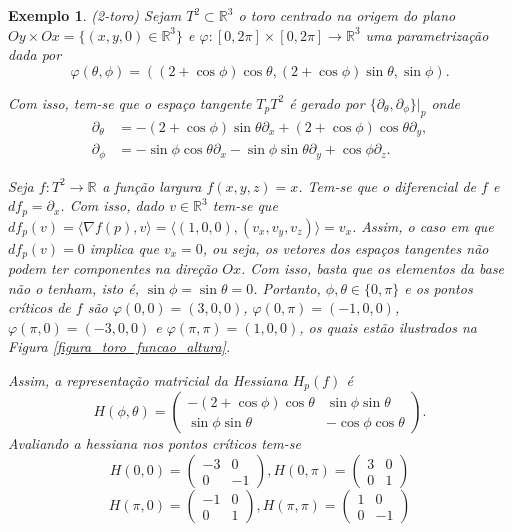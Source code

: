 \documentclass[12pt]{book}
\newtheorem{exemplo}[teorema]{Exemplo}
\newcommand{\derivadaparcialabrev}[1]{\partial_{#1}}
\newcommand{\produtointerno}[2]{\langle #1, #2 \rangle}
\newcommand{\real}[1]{\mathbb{R}^{#1}}
\newcommand{\reta}{\real{}}
\begin{document}
	\begin{exemplo}
		(2-toro) Sejam $T^{2} \subset \real{3}$ o toro centrado na origem do plano $Oy\times Ox = \{(x, y ,0) \in \real{3}\}$ e $\varphi:[0,2\pi]\times [0,2\pi] \to \real{3}$ uma parametrização dada por 
		$$
		\varphi(\theta, \phi) = ((2+\cos\phi)\cos\theta, (2+\cos\phi)\sin\theta, \sin\phi).
		$$
		
		Com isso, tem-se que o espaço tangente $T_{p}T^{2} $ é gerado por $ \{\derivadaparcialabrev{\theta}, \derivadaparcialabrev{\phi} \}|_{p}$ onde
		$$
		\begin{aligned}
			\derivadaparcialabrev{\theta} &= -(2+\cos\phi)\sin\theta \derivadaparcialabrev{x}+(2+\cos\phi)\cos\theta \derivadaparcialabrev{y},
			\\
			\derivadaparcialabrev{\phi} &=  - \sin\phi \cos\theta 	\derivadaparcialabrev{x} - \sin\phi \sin\theta 	\derivadaparcialabrev{y} +\cos\phi				\derivadaparcialabrev{z}.
			\end{aligned} 
		$$
				
		Seja $f:T^{2} \to \reta$ a função largura $f(x,y,z)=x$. Tem-se que o diferencial de $f$ e $df_{p} = \derivadaparcialabrev{x}$. Com isso, dado $v \in \real{3}$ tem-se que $df_{p}(v) = \produtointerno{\nabla f(p)}{v}  = \produtointerno{(1,0,0)}{(v_{x}, v_{y}, v_{z})} =v_{x}$. Assim, o caso em que $df_{p}(v) = 0$ implica que $v_{x} = 0$, ou seja, os vetores dos espaços tangentes não podem ter componentes na direção $Ox$. Com isso, basta que os elementos da base não o tenham, isto é, $\sin\phi = \sin\theta = 0$. Portanto, $\phi, \theta \in \{0, \pi\}$ e os pontos críticos de $f$ são $\varphi(0,0) = (3,0,0)$, $\varphi(0,\pi) = (-1,0,0)$, $\varphi(\pi,0) = (-3,0,0)$ e $\varphi(\pi,\pi) = (1,0,0)$, os quais estão ilustrados na Figura \ref{figura_toro_funcao_altura}.
			
		Assim, a representação matricial da Hessiana $H_{p}(f)$ é
			$$
			H(\phi, \theta) = 
			\left(
			\begin{array}{cc}
			-(2+\cos\phi)\cos\theta & \sin\phi \sin\theta  
			\\
			\sin\phi \sin\theta   & -\cos\phi \cos\theta  
			\end{array}
			\right).
			$$
		Avaliando a hessiana nos pontos críticos tem-se
			$$
			H(0, 0) = 
			\left(
			\begin{array}{cc}
			-3 & 0
			\\
			0& -1
			\end{array}
			\right),
			H(0, \pi) = 
			\left(
			\begin{array}{cc}
			3 & 0
			\\
			0& 1
			\end{array}
			\right)
			$$
			$$
			H(\pi, 0) = 
			\left(
			\begin{array}{cc}
			-1 & 0
			\\
			0& 1
			\end{array}
			\right),
			H(\pi, \pi) = 
			\left(
			\begin{array}{cc}
			1 & 0
			\\
			0& -1
			\end{array}
			\right)
			$$
			

\end{exemplo}
\end{document}
